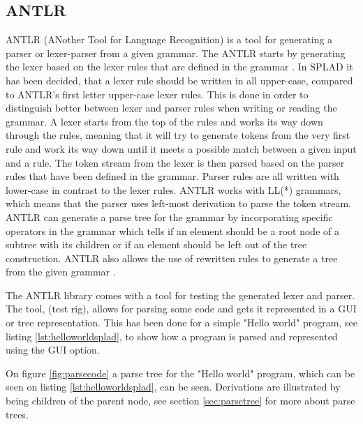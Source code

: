 \subsection{ANTLR}
ANTLR (ANother Tool for Language Recognition) is a tool for generating a parser or lexer-parser from a given grammar. The ANTLR starts by generating the lexer based on the lexer rules that are defined in the grammar \citep{ANTLRLexer}. In SPLAD it has been decided, that a lexer rule should be written in all upper-case, compared to ANTLR's first letter upper-case lexer rules. This is done in order to distinguish better between lexer and parser rules when writing or reading the grammar. A lexer starts from the top of the rules and works its way down through the rules, meaning that it will try to generate tokens from the very first rule and work its way down until it meets a possible match between a given input and a rule. 
The token stream from the lexer is then parsed based on the parser rules that have been defined in the grammar. Parser rules are all written with lower-case in contrast to the lexer rules. ANTLR works with LL(*) grammars, which means that the parser uses left-most derivation to parse the token stream. ANTLR can generate a parse tree for the grammar by incorporating specific operators in the grammar which tells if an element should be a root node of a subtree with its children or if an element should be left out of the tree construction. ANTLR also allows the use of rewritten rules to generate a tree from the given grammar \citep{ANTLRTreeCon}.

The ANTLR library comes with a tool for testing the generated lexer and parser. The tool, (test rig), allows for parsing some code and gets it represented
in a GUI or tree representation. This has been done for a simple "Hello world" program, see listing \ref{lst:helloworldsplad}, to show how a program is parsed and represented using the GUI option.


On figure \ref{fig:parsecode} a parse tree for the "Hello world" program, which can be seen on listing \ref{lst:helloworldsplad}, can be seen. Derivations are illustrated by being children of the parent node, see section \ref{sec:parsetree} for more about parse trees.